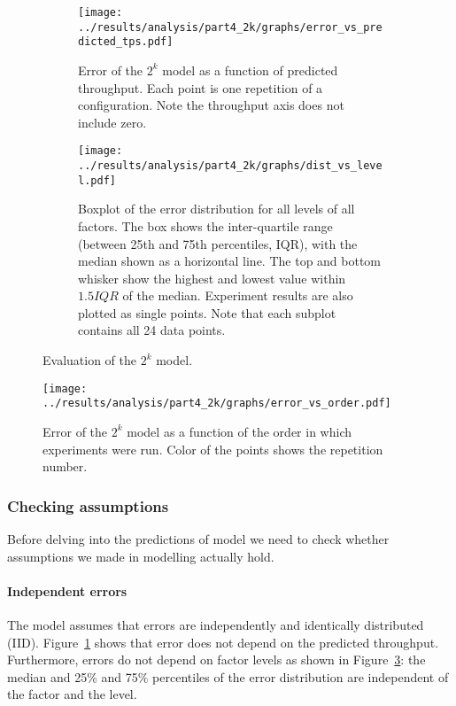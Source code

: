 \documentclass[11pt]{article}
\begin{document}
\begin{figure}[h]
\centering
\begin{subfigure}[t]{0.49\textwidth}
\centering
\texttt{[image: ../results/analysis/part4\_2k/graphs/error\_vs\_predicted\_tps.pdf]}
\caption{Error of the $2^k$ model as a function of predicted throughput. Each point is one repetition of a configuration. Note the throughput axis does not include zero.}
\label{fig:part4:errorvspredicted}
\end{subfigure}
\begin{subfigure}[t]{0.49\textwidth}
\centering
\texttt{[image: ../results/analysis/part4\_2k/graphs/dist\_vs\_level.pdf]}
\caption{Boxplot of the error distribution for all levels of all factors. The box shows the inter-quartile range (between 25th and 75th percentiles, IQR), with the median shown as a horizontal line. The top and bottom whisker show the highest and lowest value within $1.5 IQR$ of the median. Experiment results are also plotted as single points. Note that each subplot contains all 24 data points.}
\label{fig:part4:errordistvslevel}
\end{subfigure}
\caption{Evaluation of the $2^k$ model.}
\end{figure}


\begin{figure}[h]
\centering
\texttt{[image: ../results/analysis/part4\_2k/graphs/error\_vs\_order.pdf]}
\caption{Error of the $2^k$ model as a function of the order in which experiments were run. Color of the points shows the repetition number.}
\label{fig:part4:errorvsorder}
\end{figure}


\subsubsection{Checking assumptions}

Before delving into the predictions of model we need to check whether assumptions we made in modelling actually hold.

\paragraph{Independent errors}

The model assumes that errors are independently and identically distributed (IID). Figure~\ref{fig:part4:errorvspredicted} shows that error does not depend on the predicted throughput. Furthermore, errors do not depend on factor levels as shown in Figure~\ref{fig:part4:errordistvslevel}: the median and 25\% and 75\% percentiles of the error distribution are independent of the factor and the level.
\end{document}
